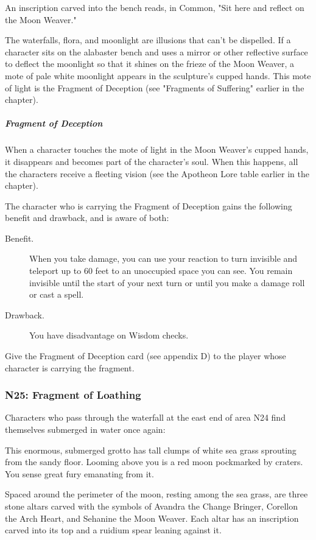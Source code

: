 \documentclass[10pt,a4paper,twoside,fancy,bg=print,twocolumn,openany,nodeprecatedcode]{dndbook}
\begin{document}
\begin{DndReadAloud}{}
An inscription carved into the bench reads, in Common, "Sit here and reflect on the Moon Weaver."

\end{DndReadAloud}

The waterfalls, flora, and moonlight are illusions that can't be dispelled. If a character sits on the alabaster bench and uses a mirror or other reflective surface to deflect the moonlight so that it shines on the frieze of the Moon Weaver, a mote of pale white moonlight appears in the sculpture's cupped hands. This mote of light is the Fragment of Deception (see "Fragments of Suffering" earlier in the chapter).

\subparagraph{Fragment of Deception}
When a character touches the mote of light in the Moon Weaver's cupped hands, it disappears and becomes part of the character's soul. When this happens, all the characters receive a fleeting vision (see the Apotheon Lore table earlier in the chapter).

The character who is carrying the Fragment of Deception gains the following benefit and drawback, and is aware of both:

\begin{DndSidebar}[float=!b]{}

\begin{description}
\item[Benefit.]
When you take damage, you can use your reaction to turn invisible and teleport up to 60 feet to an unoccupied space you can see. You remain invisible until the start of your next turn or until you make a damage roll or cast a spell.
\item[Drawback.]
You have disadvantage on Wisdom checks.
\end{description}



\end{DndSidebar}

Give the Fragment of Deception card (see appendix D) to the player whose character is carrying the fragment.

\subsubsection{N25: Fragment of Loathing}
Characters who pass through the waterfall at the east end of area N24 find themselves submerged in water once again:

\begin{DndReadAloud}{}
This enormous, submerged grotto has tall clumps of white sea grass sprouting from the sandy floor. Looming above you is a red moon pockmarked by craters. You sense great fury emanating from it.

Spaced around the perimeter of the moon, resting among the sea grass, are three stone altars carved with the symbols of Avandra the Change Bringer, Corellon the Arch Heart, and Sehanine the Moon Weaver. Each altar has an inscription carved into its top and a ruidium spear leaning against it.

\end{DndReadAloud}
\end{document}
